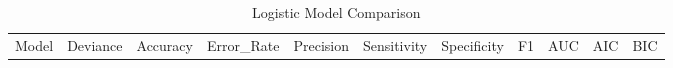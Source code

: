 \documentclass[
  11pt]{article}
\begin{document}
\begin{longtable}[]{@{}
  >{\raggedright\arraybackslash}p{}
  >{\raggedleft\arraybackslash}p{}
  >{\raggedleft\arraybackslash}p{}
  >{\raggedleft\arraybackslash}p{}
  >{\raggedleft\arraybackslash}p{}
  >{\raggedleft\arraybackslash}p{}
  >{\raggedleft\arraybackslash}p{}
  >{\raggedleft\arraybackslash}p{}
  >{\raggedleft\arraybackslash}p{}
  >{\raggedleft\arraybackslash}p{}
  >{\raggedleft\arraybackslash}p{}@{}}
\caption{Logistic Model Comparison}\tabularnewline
\toprule\noalign{}
\begin{minipage}[b]{\linewidth}\raggedright
Model
\end{minipage} & \begin{minipage}[b]{\linewidth}\raggedleft
Deviance
\end{minipage} & \begin{minipage}[b]{\linewidth}\raggedleft
Accuracy
\end{minipage} & \begin{minipage}[b]{\linewidth}\raggedleft
Error\_Rate
\end{minipage} & \begin{minipage}[b]{\linewidth}\raggedleft
Precision
\end{minipage} & \begin{minipage}[b]{\linewidth}\raggedleft
Sensitivity
\end{minipage} & \begin{minipage}[b]{\linewidth}\raggedleft
Specificity
\end{minipage} & \begin{minipage}[b]{\linewidth}\raggedleft
F1
\end{minipage} & \begin{minipage}[b]{\linewidth}\raggedleft
AUC
\end{minipage} & \begin{minipage}[b]{\linewidth}\raggedleft
AIC
\end{minipage} & \begin{minipage}[b]{\linewidth}\raggedleft
BIC
\end{minipage} \\

\end{longtable}
\end{document}
